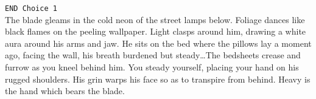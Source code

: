 \documentclass{antiquebook}
\begin{document}
\texttt{END Choice 1} \\

\indent The blade gleams in the cold neon of the street lamps below. Foliage dances like black flames on the peeling wallpaper. 
Light clasps around him, drawing a white aura around his arms and jaw. He sits on the bed where the pillows lay a moment ago, 
facing the wall, his breath burdened but steady\dots The bedsheets crease and furrow as you kneel behind him. 
You steady yourself, placing your hand on his rugged shoulders. His grin warps his face so as to transpire from behind. 
Heavy is the hand which bears the blade.
\end{document}
